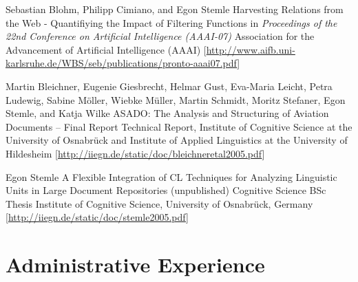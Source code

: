 \documentclass[11pt,a4paper]{moderncv}
\begin{document}
    {Sebastian Blohm, Philipp Cimiano, and Egon Stemle}
    {Harvesting Relations from the Web - Quantifiying the Impact of Filtering Functions}
    {\small in {\em Proceedings of the 22nd Conference on Artificial Intelligence (AAAI-07)}}
    {\small Association for the Advancement of Artificial Intelligence (AAAI)}
    {[\url{http://www.aifb.uni-karlsruhe.de/WBS/seb/publications/pronto-aaai07.pdf}]}

    {Martin Bleichner, Eugenie Giesbrecht, Helmar Gust, Eva-Maria Leicht, Petra
  Ludewig, Sabine M{\"o}ller, Wiebke M{\"u}ller, Martin Schmidt, Moritz
  Stefaner, Egon Stemle, and Katja Wilke}
    {ASADO: The Analysis and Structuring of Aviation Documents -- Final Report}
    {\small Technical Report, Institute of Cognitive Science at the University of
  Osnabr{\"u}ck and Institute of Applied Linguistics at the University of
  Hildesheim}
    {}
    {[\url{http://iiegn.de/static/doc/bleichneretal2005.pdf}]}

    {Egon Stemle}
    {A Flexible Integration of CL Techniques for Analyzing Linguistic Units in Large Document Repositories (unpublished)}
    {\small Cognitive Science BSc Thesis}
    {\small Institute of Cognitive Science, University of Osnabr\"{u}ck, Germany}
    {[\url{http://iiegn.de/static/doc/stemle2005.pdf}]}
\closesection{}


\section{Administrative Experience}
\closesection{}
\end{document}
